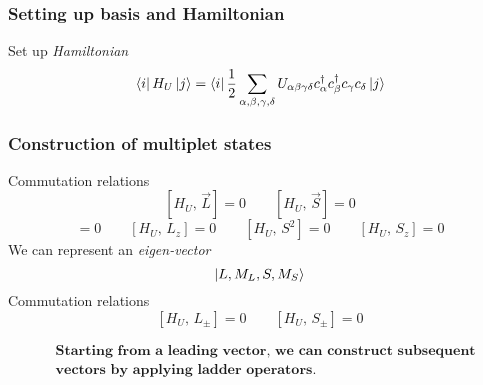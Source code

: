 \begin{frame}[t]
  \frametitle{Setting up basis and Hamiltonian}
  \footnotesize
  Set up \emph{Hamiltonian}
  \[\Bra{i} H_U \Ket{j} = \Bra{i} \frac{1}{2} \sum_{\alpha,\beta,\gamma,\delta} U_{\alpha\beta\gamma\delta} c_\alpha^\dag c_\beta^\dag c_\gamma c_\delta \Ket{j} \]
  
\end{frame}

\begin{frame}[t]
  \frametitle{Construction of multiplet states}
  \footnotesize
  Commutation relations
  \[ [H_U,\,\vec{L}]=0 \qquad [H_U,\,\vec{S}]=0 \]
  \begin{equation*}
  [H_U,\,L^2]=0 \qquad [H_U,\,L_z]=0 \qquad
  [H_U,\,S^2]=0 \qquad [H_U,\,S_z]=0
  \end{equation*}
  We can represent an \emph{eigen-vector}
  \[\Ket{L, M_L, S, M_S}\] \pause
  Commutation relations
  \[ [H_U,\,L_\pm]=0 \qquad [H_U,\,S_\pm]=0 \]
  
  \vspace{-1em}
  \emph{\begin{equation*}
  \boxed{
  \begin{aligned}
  & \textbf{Starting from a leading vector, we can construct subsequent} \\
  & \textbf{vectors by applying ladder operators.}
  \end{aligned}
  }
  \end{equation*}}
\end{frame}

